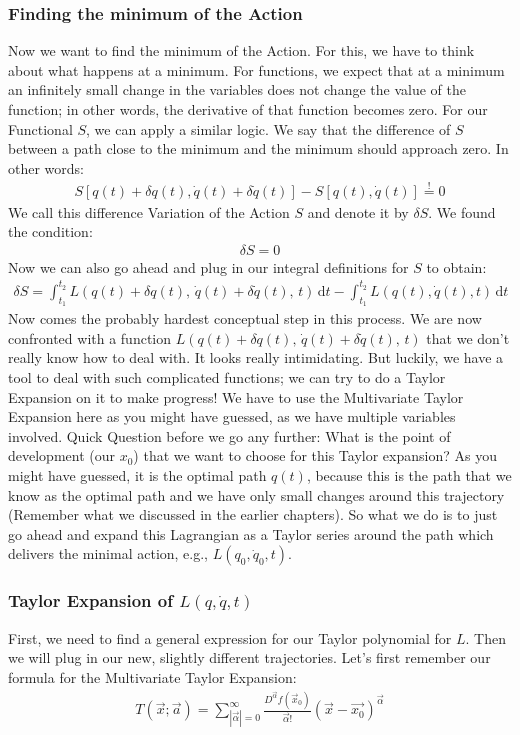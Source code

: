 \documentclass{article}
\begin{document}
	\subsubsection*{Finding the minimum of the Action}
	Now we want to find the minimum of the Action. For this, we have to think about what happens at a minimum. For functions, we expect that at a minimum an infinitely small change in the variables does not change the value of the function; in other words, the derivative of that function becomes zero. For our Functional $S$, we can apply a similar logic. We say that the difference of $S$ between a path close to the minimum and the minimum should approach zero. In other words:
	\begin{align}
		S[q(t)+\delta q(t), \dot{q}(t)+\delta \dot{q}(t)] - S[q(t), \dot{q}(t)]  \overset{!}{=} 0
	\end{align}
	We call this difference Variation of the Action $S$ and denote it by $\delta S$. We found the condition:
	\begin{align}
		\delta S = 0
	\end{align}
	Now we can also go ahead and plug in our integral definitions for $S$ to obtain:
	\begin{align}
		\delta S=\int_{t_1}^{t_2} L(q(t)+\delta q(t),\,\dot{q}(t)+\delta \dot{q}(t),\, t)\,\text{d}t - \int_{t_1}^{t_2} L(q(t), \dot{q}(t), t)\,\text{d}t
	\end{align}
	Now comes the probably hardest conceptual step in this process. We are now confronted with a function $L(q(t)+\delta q(t),\,\dot{q}(t)+\delta \dot{q}(t),\, t)$ that we don't really know how to deal with. It looks really intimidating. But luckily, we have a tool to deal with such complicated functions; we can try to do a Taylor Expansion on it to make progress! We have to use the Multivariate Taylor Expansion here as you might have guessed, as we have multiple variables involved. Quick Question before we go any further: What is the point of development (our $x_0$) that we want to choose for this Taylor expansion? As you might have guessed, it is the optimal path $q(t)$, because this is the path that we know as the optimal path and we have only small changes around this trajectory (Remember what we discussed in the earlier chapters). 
	So what we do is to just go ahead and expand this Lagrangian as a Taylor series around the path which delivers the minimal action, e.g., $L(q_0, \dot{q}_0, t)$.
	
	\subsubsection{Taylor Expansion of $L(q,\dot{q}, t)$}
	First, we need to find a general expression for our Taylor polynomial for $L$. Then we will plug in our new, slightly different trajectories. 
	Let's first remember our formula for the Multivariate Taylor Expansion:
	\begin{align}
		T(\vec{x};\vec{a}) = \sum^\infty_{|\vec{\alpha}|=0}\frac{D^{\Vec{\alpha}}f(\vec{x}_0)}{\vec{\alpha}!}\left(\vec{x}-\vec{x_0}\right)^{\vec{\alpha}}
	\end{align}
	
\end{document}
